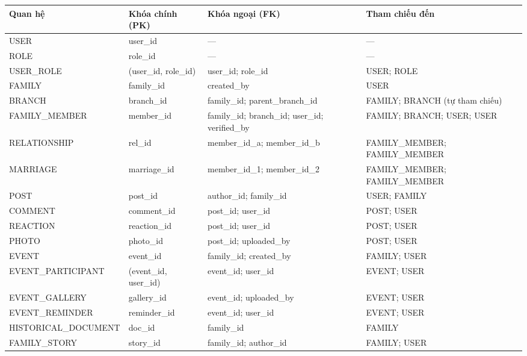 \begin{small}
	\begin{longtable}{|>{\raggedright\arraybackslash}p{3.0cm}|>{\raggedright\arraybackslash}p{2.0cm}|>{\raggedright\arraybackslash}p{4.0cm}|>{\raggedright\arraybackslash}p{4.0cm}|}
		\hline
		\textbf{Quan hệ} & \textbf{Khóa chính (PK)} & \textbf{Khóa ngoại (FK)} & \textbf{Tham chiếu đến} \\ \hline
		\endhead
		\hline
		\endfoot
		
		USER & user\_id & --- & --- \\ \hline
		ROLE & role\_id & --- & --- \\ \hline
		USER\_\allowbreak ROLE & (user\_id, role\_id) & user\_id; role\_id & USER; ROLE \\ \hline
		FAMILY & family\_id & created\_by & USER \\ \hline
		BRANCH & branch\_id & family\_id; parent\_branch\_id & FAMILY; BRANCH (tự tham chiếu) \\ \hline
		FAMILY\_\allowbreak MEMBER & member\_id & family\_id; branch\_id; user\_id; verified\_by & FAMILY; BRANCH; USER; USER \\ \hline
		RELATIONSHIP & rel\_id & member\_id\_a; member\_id\_b & FAMILY\_MEMBER; FAMILY\_MEMBER \\ \hline
		MARRIAGE & marriage\_id & member\_id\_1; member\_id\_2 & FAMILY\_MEMBER; FAMILY\_MEMBER \\ \hline
		POST & post\_id & author\_id; family\_id & USER; FAMILY \\ \hline
		COMMENT & comment\_id & post\_id; user\_id & POST; USER \\ \hline
		REACTION & reaction\_id & post\_id; user\_id & POST; USER \\ \hline
		PHOTO & photo\_id & post\_id; uploaded\_by & POST; USER \\ \hline
		EVENT & event\_id & family\_id; created\_by & FAMILY; USER \\ \hline
		EVENT\_\allowbreak PARTICIPANT & (event\_id, user\_id) & event\_id; user\_id & EVENT; USER \\ \hline
		EVENT\_\allowbreak GALLERY & gallery\_id & event\_id; uploaded\_by & EVENT; USER \\ \hline
		EVENT\_\allowbreak REMINDER & reminder\_id & event\_id; user\_id & EVENT; USER \\ \hline
		HISTORICAL\_\allowbreak DOCUMENT & doc\_id & family\_id & FAMILY \\ \hline
		FAMILY\_\allowbreak STORY & story\_id & family\_id; author\_id & FAMILY; USER \\ \hline

\end{longtable}
\end{small}
